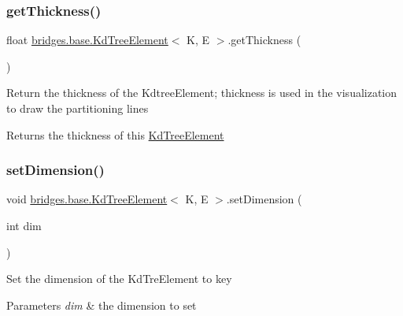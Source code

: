 \subsubsection{\texorpdfstring{get\+Thickness()}{getThickness()}}
{\footnotesize\ttfamily float \mbox{\hyperlink{classbridges_1_1base_1_1_kd_tree_element}{bridges.\+base.\+Kd\+Tree\+Element}}$<$ K, E $>$.get\+Thickness (\begin{DoxyParamCaption}{ }\end{DoxyParamCaption})}

Return the thickness of the Kdtree\+Element; thickness is used in the visualization to draw the partitioning lines

\begin{DoxyReturn}{Returns}
the thickness of this \mbox{\hyperlink{classbridges_1_1base_1_1_kd_tree_element}{Kd\+Tree\+Element}} 
\end{DoxyReturn}
\mbox{\label{classbridges_1_1base_1_1_kd_tree_element_af3fa89cbd20fc2c3f30784db16b6dec4}} 
\subsubsection{\texorpdfstring{set\+Dimension()}{setDimension()}}
{\footnotesize\ttfamily void \mbox{\hyperlink{classbridges_1_1base_1_1_kd_tree_element}{bridges.\+base.\+Kd\+Tree\+Element}}$<$ K, E $>$.set\+Dimension (\begin{DoxyParamCaption}\item[{int}]{dim }\end{DoxyParamCaption})}

Set the dimension of the Kd\+Tre\+Element to key 
\begin{DoxyParams}{Parameters}
{\em dim} & the dimension to set \\
\hline
\end{DoxyParams}
\mbox{\label{classbridges_1_1base_1_1_kd_tree_element_a52412fc59c743a8a0ede057ed2451be9}} 
